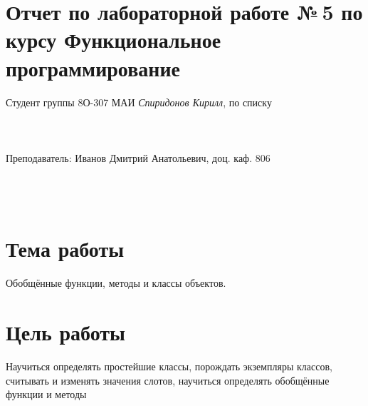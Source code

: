 \documentclass[12pt]{article}
\begin{document}
\section*{Отчет по лабораторной работе №\,5
по курсу \guillemotleft  Функциональное программирование\guillemotright}
\begin{flushright}
Студент группы 8О-307 МАИ \textit{Спиридонов Кирилл},  по списку \\
 \\
 \\
\ \\
Преподаватель: Иванов Дмитрий Анатольевич, доц. каф. 806 \\
 \\
 \\
 \\

\end{flushright}

\section{Тема работы}
{\large Обобщённые функции, методы и классы объектов. \par}

\section{Цель работы}
{\large Научиться определять простейшие классы, порождать экземпляры классов, считывать и изменять значения слотов, научиться 
определять обобщённые функции и методы\par}
\end{document}
